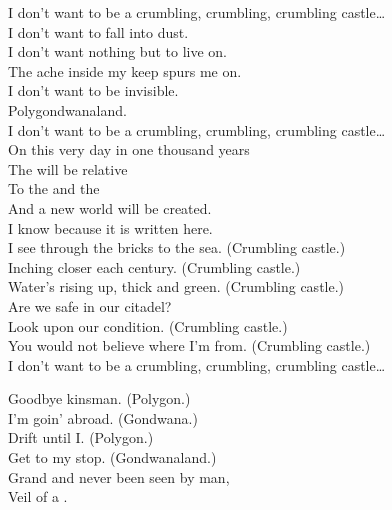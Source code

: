 I don't want to be a crumbling, crumbling, crumbling castle… \\

I don't want to fall into dust. \\
I don't want nothing but to live on. \\
The ache inside my keep spurs me on. \\
I don't want to be invisible. \\
Polygondwanaland. \\

I don't want to be a crumbling, crumbling, crumbling castle… \\

On this very day in one thousand years \\
The  will be relative \\
To the  and the  \\
And a new world will be created. \\
I know because it is written here. \\

I see through the bricks to the sea. (Crumbling castle.) \\
Inching closer each century. (Crumbling castle.) \\
Water's rising up, thick and green. (Crumbling castle.) \\

Are we safe in our citadel? \\
Look upon our condition. (Crumbling castle.) \\
You would not believe where I'm from. (Crumbling castle.) \\

I don't want to be a crumbling, crumbling, crumbling castle… \\





Goodbye kinsman. (Polygon.) \\
I'm goin' abroad. (Gondwana.) \\
Drift until I. (Polygon.) \\
Get to my stop. (Gondwanaland.) \\

Grand and never been seen by man, \\
Veil of a . \\

